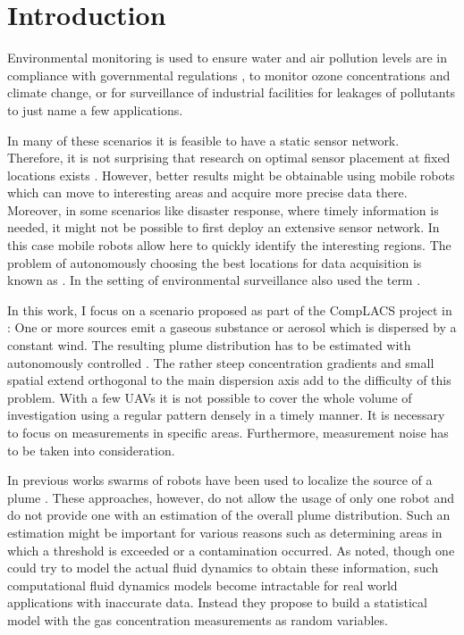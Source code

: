 \chapter{Introduction}
Environmental monitoring is used to ensure water and air pollution levels are in
compliance with governmental regulations \parencite[i.\,e.][]{Anonymous:1996ui}, 
to monitor ozone concentrations and climate change, or for surveillance of 
industrial facilities for leakages of pollutants to just name a few 
applications.

In many of these scenarios it is feasible to have a static sensor network.  
Therefore, it is not surprising that research on optimal sensor placement at 
fixed locations exists \parencite[e.\,g.][]{Osborne:2008hi, Guestrin:2005cq, 
    Wang:kz}.  However, better results might be obtainable using mobile robots 
which can move to interesting areas and acquire more precise data there.  
Moreover, in some scenarios like disaster response, where timely information is 
needed, it might not be possible to first deploy an extensive sensor network. In 
this case mobile robots allow here to quickly identify the interesting regions.  
The problem of autonomously choosing the best locations for data acquisition is 
known as . In the setting of environmental surveillance 
\textcite{Marchant:2012wb} also used the term .

In this work, I focus on a scenario proposed as part of the CompLACS project in 
\textcite{denardi2013rn}: One or more sources emit a gaseous substance or 
aerosol which is dispersed by a constant wind. The resulting plume distribution 
has to be estimated with autonomously controlled . The rather steep concentration gradients and small spatial 
extend orthogonal to the main dispersion axis add to the difficulty of this 
problem.  With a few UAVs it is not possible to cover the whole volume of 
investigation using a regular pattern densely in a timely manner.  It is 
necessary to focus on measurements in specific areas.  Furthermore, measurement 
noise has to be taken into consideration.

In previous works swarms of robots have been used to localize the source of 
a plume \parencite{Jatmiko:2007df, Zarzhitsky:2005tz}. These approaches, 
however, do not allow the usage of only one robot and do not provide one with an 
estimation of the overall plume distribution. Such an estimation might be 
important for various reasons such as determining areas in which a threshold is 
exceeded or a contamination occurred. As \textcite{Reggente:2009ti} noted, 
though one could try to model the actual fluid dynamics to obtain these 
information, such computational fluid dynamics models become intractable for 
real world applications with inaccurate data.  Instead they propose to build 
a statistical model with the gas concentration measurements as random variables.

